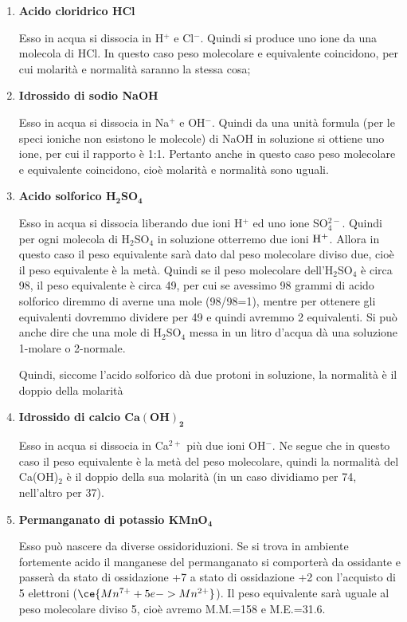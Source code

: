 \begin{enumerate}
    \item \textbf{Acido cloridrico HCl}
    
    Esso in acqua si dissocia in H$^+$ e Cl$^-$. Quindi si produce uno ione da una molecola di HCl. In questo caso peso molecolare e equivalente coincidono, per cui molarità e normalità saranno la stessa cosa;
    \item \textbf{Idrossido di sodio NaOH}
    
    Esso in acqua si dissocia in Na$^+$ e OH$^-$. Quindi da una unità formula (per le speci ioniche non esistono le molecole) di NaOH in soluzione si ottiene uno ione, per cui il rapporto è 1:1. Pertanto anche in questo caso peso molecolare e equivalente coincidono, cioè molarità e normalità sono uguali.
    \item \textbf{Acido solforico $\mathbf{H_2SO_4}$}
    
    Esso in acqua si dissocia liberando due ioni H$^+$ ed uno ione SO$_4^{2-}$. Quindi per ogni molecola di H$_2$SO$_4$ in soluzione otterremo due ioni $\rm H^+$. Allora in questo caso il peso equivalente sarà dato dal peso molecolare diviso due, cioè il peso equivalente è la metà. Quindi se il peso molecolare dell'H$_2$SO$_4$ è circa 98, il peso equivalente è circa 49, per cui se avessimo 98 grammi di acido solforico diremmo di averne una mole (98/98=1), mentre per ottenere gli equivalenti dovremmo dividere per 49 e quindi avremmo 2 equivalenti. Si può anche dire che una mole di H$_2$SO$_4$ messa in un litro d'acqua dà una soluzione 1-molare o 2-normale.

    Quindi, siccome l'acido solforico dà due protoni in soluzione, la normalità è il doppio della molarità
    \item \textbf{Idrossido di calcio $\mathbf{Ca(OH)_2}$}
    
    Esso in acqua si dissocia in Ca$^{2+}$ più due ioni OH$^-$. Ne segue che in questo caso il peso equivalente è la metà del peso molecolare, quindi la normalità del Ca(OH)$_2$ è il doppio della sua molarità (in un caso dividiamo per 74, nell'altro per 37).
    \item \textbf{Permanganato di potassio KMnO$_{\boldsymbol{4}}$}
    
    Esso può nascere da diverse ossidoriduzioni. Se si trova in ambiente fortemente acido il manganese del permanganato si comporterà da ossidante e passerà da stato di ossidazione +7 a stato di ossidazione +2 con l'acquisto di 5 elettroni ($\ce{Mn^{7+} + 5e -> Mn^{2+}}$). Il peso equivalente sarà uguale al peso molecolare diviso 5, cioè avremo M.M.=158 e M.E.=31.6.


\end{enumerate}
